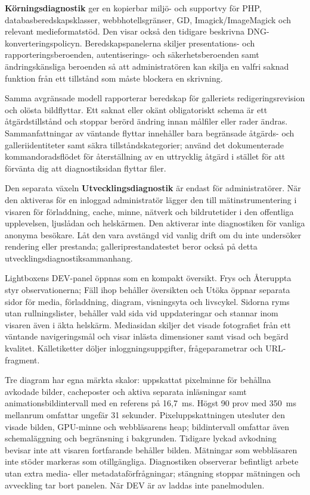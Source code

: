 \documentclass[11pt,a4paper]{article}
\newcommand{\ui}[1]{\textbf{#1}}
\begin{document}
\ui{Körningsdiagnostik} ger en kopierbar miljö- och supportvy för PHP,
databasberedskapsklasser, webbhotellsgränser, GD, Imagick/ImageMagick och
relevant medieformatstöd. Den visar också den tidigare beskrivna
DNG-konverteringspolicyn. Beredskapspanelerna skiljer presentations- och
rapporteringsberoenden, autentiserings- och säkerhetsberoenden samt
ändringskänsliga beroenden så att administratören kan skilja en valfri saknad
funktion från ett tillstånd som måste blockera en skrivning.

Samma avgränsade modell rapporterar beredskap för galleriets redigeringsrevision
och olösta bildflyttar. Ett saknat eller okänt obligatoriskt schema är ett
åtgärdstillstånd och stoppar berörd ändring innan målfiler eller rader ändras.
Sammanfattningar av väntande flyttar innehåller bara begränsade åtgärds- och
galleriidentiteter samt säkra tillståndskategorier; använd det dokumenterade
kommandoradsflödet för återställning av en uttrycklig åtgärd i stället för att
förvänta dig att diagnostiksidan flyttar filer.

Den separata växeln \ui{Utvecklingsdiagnostik} är endast för administratörer.
När den aktiveras för en inloggad administratör lägger den till
mätinstrumentering i visaren för förladdning, cache, minne, nätverk och
bildrutetider i den offentliga upplevelsen, ljuslådan och helskärmen. Den
aktiverar inte diagnostiken för vanliga anonyma besökare. Låt den vara avstängd
vid vanlig drift om du inte undersöker rendering eller prestanda;
galleriprestandatestet beror också på detta utvecklingsdiagnostiksammanhang.

Lightboxens DEV-panel öppnas som en kompakt översikt. Frys och Återuppta styr
observationerna; Fäll ihop behåller översikten och Utöka öppnar separata sidor
för media, förladdning, diagram, visningsyta och livscykel. Sidorna ryms utan
rullningslister, behåller vald sida vid uppdateringar och stannar inom visaren
även i äkta helskärm. Mediasidan skiljer det visade fotografiet från ett
väntande navigeringsmål och visar inlästa dimensioner samt visad och begärd
kvalitet. Källetiketter döljer inloggningsuppgifter, frågeparametrar och
URL-fragment.

Tre diagram har egna märkta skalor: uppskattat pixelminne för behållna avkodade
bilder, cacheposter och aktiva separata inläsningar samt animationsbildintervall
med en referens på 16,7~ms. Högst 90 prov med 350~ms mellanrum omfattar ungefär
31 sekunder. Pixeluppskattningen utesluter den visade bilden, GPU-minne och
webbläsarens heap; bildintervall omfattar även schemaläggning och begränsning i
bakgrunden. Tidigare lyckad avkodning bevisar inte att visaren fortfarande
behåller bilden. Mätningar som webbläsaren inte stöder markeras som
otillgängliga. Diagnostiken observerar befintligt arbete utan extra media- eller
metadataförfrågningar; stängning stoppar mätningen och avveckling tar bort
panelen. När DEV är av laddas inte panelmodulen.
\end{document}
